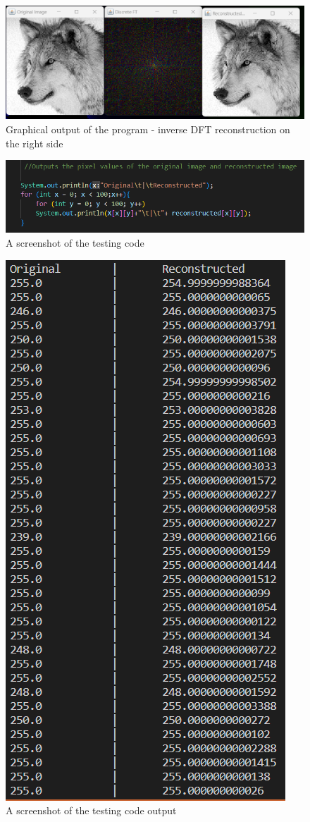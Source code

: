         \begin{figure}[H]
            \centering
            \includegraphics[width=0.8\columnwidth]{Figures/Week 1/W1-SimpleFT-InverseDFT-Graphical-Outputs.png}
            \caption{Graphical output of the program - inverse DFT reconstruction on the right side}
            \label{fig:inverse-DFT-Images-Output}
    \end{figure}
    
        \begin{figure}[H]
            \centering
            \includegraphics[width=1\columnwidth]{Figures/Week 1/W1-SimpleFT-InverseDFT-Test-1.0-code.png}
            \caption{A screenshot of the testing code}
            \label{fig:Testing-Code}
    \end{figure}
    
        \begin{figure}[H]
            \centering
            \includegraphics[width=.49\columnwidth]{Figures/Week 1/W1-SimpleFT-InverseDFT-Test-1.0-Output.png}
            \caption{A screenshot of the testing code output}
            \label{fig:Testing-Code-output}
        \end{figure}
        
